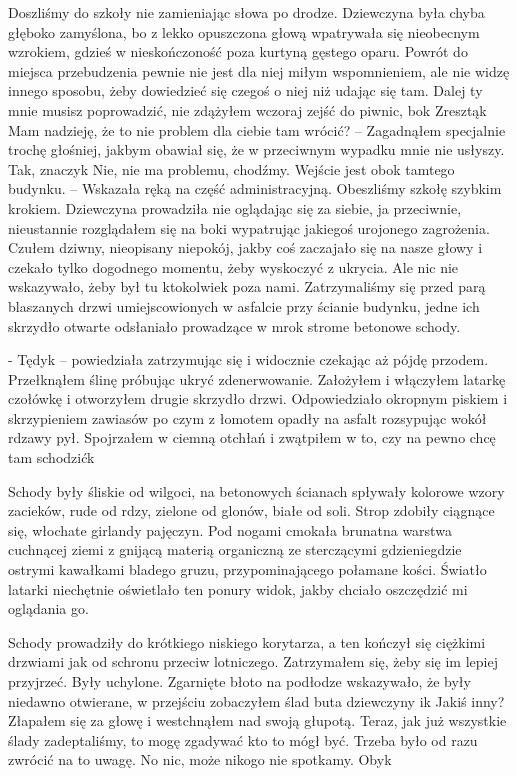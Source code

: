 \documentclass[../MAIN.tex]{subfiles}
\begin{document}
Doszliśmy do szkoły nie zamieniając słowa po drodze. Dziewczyna była chyba głęboko zamyślona, bo z lekko opuszczona głową wpatrywała się nieobecnym wzrokiem, gdzieś w nieskończoność poza kurtyną gęstego oparu. Powrót do miejsca przebudzenia pewnie nie jest dla niej miłym wspomnieniem, ale nie widzę innego sposobu, żeby dowiedzieć się czegoś o niej niż udając się tam.
\sd
\xx Dalej ty mnie musisz poprowadzić, nie zdążyłem wczoraj zejść do piwnic, bo\3k Zresztą\3k Mam nadzieję, że to nie problem dla ciebie tam wrócić? – Zagadnąłem specjalnie trochę głośniej, jakbym obawiał się, że w przeciwnym wypadku mnie nie usłyszy.
\xx Tak, znaczy\3k Nie, nie ma problemu, chodźmy. Wejście jest obok tamtego budynku. – Wskazała ręką na część administracyjną.
\qd
Obeszliśmy szkołę szybkim krokiem. Dziewczyna prowadziła nie oglądając się za siebie, ja przeciwnie, nieustannie rozglądałem się na boki wypatrując jakiegoś urojonego zagrożenia. Czułem dziwny, nieopisany niepokój, jakby coś zaczajało się na nasze głowy i czekało tylko dogodnego momentu, żeby wyskoczyć z ukrycia. Ale nic nie wskazywało, żeby był tu ktokolwiek poza nami. Zatrzymaliśmy się przed parą blaszanych drzwi umiejscowionych w asfalcie przy ścianie budynku, jedne ich skrzydło otwarte odsłaniało prowadzące w mrok strome betonowe schody.

- Tędy\3k – powiedziała zatrzymując się i widocznie czekając aż pójdę przodem. Przełknąłem ślinę próbując ukryć zdenerwowanie. Założyłem i włączyłem latarkę czołówkę i otworzyłem drugie skrzydło drzwi. Odpowiedziało okropnym piskiem i skrzypieniem zawiasów po czym z łomotem opadły na asfalt rozsypując wokół rdzawy pył. Spojrzałem w ciemną otchłań i zwątpiłem w to, czy na pewno chcę tam schodzić\3k

Schody były śliskie od wilgoci, na betonowych ścianach spływały kolorowe wzory zacieków, rude od rdzy, zielone od glonów, białe od soli. Strop zdobiły ciągnące się, włochate girlandy pajęczyn. Pod nogami cmokała brunatna warstwa cuchnącej ziemi z gnijącą materią organiczną ze sterczącymi gdzieniegdzie ostrymi kawałkami bladego gruzu, przypominającego połamane kości. Światło latarki niechętnie oświetlało ten ponury widok, jakby chciało oszczędzić mi oglądania go. 

Schody prowadziły do krótkiego niskiego korytarza, a ten kończył się ciężkimi drzwiami jak od schronu przeciw lotniczego. Zatrzymałem się, żeby się im lepiej przyjrzeć. Były uchylone. Zgarnięte błoto na podłodze wskazywało, że były niedawno otwierane, w przejściu zobaczyłem ślad buta dziewczyny i\3k Jakiś inny? Złapałem się za głowę i westchnąłem nad swoją głupotą. Teraz, jak już wszystkie ślady zadeptaliśmy, to mogę zgadywać kto to mógł być. Trzeba było od razu zwrócić na to uwagę. No nic, może nikogo nie spotkamy. Oby\3k
\end{document}
